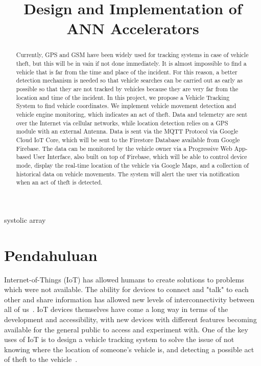 \documentclass[conference]{IEEEtran}
\begin{document}
\title{Design and Implementation of ANN Accelerators}

\author{
}


\maketitle


\begin{abstract}
Currently, GPS and GSM have been widely used for tracking systems in case of vehicle theft, but this will be in vain if not done immediately. It is almost impossible to find a vehicle that is far from the time and place of the incident. For this reason, a better detection mechanism is needed so that vehicle searches can be carried out as early as possible so that they are not tracked by vehicles because they are very far from the location and time of the incident. In this project, we propose a Vehicle Tracking System to find vehicle coordinates. We implement vehicle movement detection and vehicle engine monitoring, which indicates an act of theft. Data and telemetry are sent over the Internet via cellular networks, while location detection relies on a GPS module with an external Antenna. Data is sent via the MQTT Protocol via Google Cloud IoT Core, which will be sent to the Firestore Database available from Google Firebase. The data can be monitored by the vehicle owner via a Progressive Web App-based User Interface, also built on top of Firebase, which will be able to control device mode, display the real-time location of the vehicle via Google Maps, and a collection of historical data on vehicle movements. The system will alert the user via notification when an act of theft is detected.
\end{abstract}

\begin{IEEEkeywords}
    systolic array 
\end{IEEEkeywords}

\section{Pendahuluan}
Internet-of-Things (IoT) has allowed humans to create solutions to problems which were not available. The ability for devices to connect and "talk" to each other and share information has allowed new levels of interconnectivity between all of us~\cite{iotmounika}. IoT devices themselves have come a long way in terms of the development and accessibility, with new devices with different features becoming available for the general public to access and experiment with. One of the key uses of IoT is to design a vehicle tracking system to solve the issue of not knowing where the location of someone's vehicle is, and detecting a possible act of theft to the vehicle~\cite{lu2014wireless}. 
\end{document}
